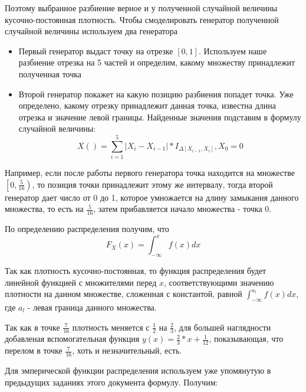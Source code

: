 \documentclass{article}
\begin{document}
Поэтому выбранное разбиение верное и у полученной случайной величины кусочно-постоянная плотность. 
Чтобы смоделировать генератор полученной случайной величины используем два генератора
\begin{itemize}
    \item Первый генератор выдаст точку на отрезке $[0, 1]$. Используем наше разбиение отрезка на
        5 частей и определим, какому множеству принадлежит полученная точка
    \item Второй генератор покажет на какую позицию разбиения попадет точка. Уже
        определено, какому отрезку принадлежит данная точка, известна длина отрезка и значение
        левой границы. Найденные значения подставим в формулу случайной величины:
        \[X() = \sum_{i = 1}^5|X_i - X_{i-1}|*I_{\Delta\left[X_{i-1}, X_{i}\right]},
        X_0 = 0\]
\end{itemize}

Например, если после работы первого генератора точка находится на множестве $\left[0,
\frac{5}{16}\right)$, то позиция точки принадлежит этому же интервалу, тогда второй генератор
дает число от 0 до 1, которое умножается на длину замыкания данного множества, то есть на
$\frac{5}{16}$, затем прибавляется начало множества - точка 0. 

По определению распределения получим, что
\[F_X(x) = \int_{-\infty}^xf(x)dx\]

Так как плотность кусочно-постоянная, то функция распределения будет линейной функцией с
множителями перед $x$, соответствующими значению плотности на данном множестве, сложенная с
константой, равной $\int_{-\infty}^{a_l}f(x)dx$, где $a_l$ - левая граница данного множества.

Так как в точке $\frac{7}{16}$ плотность меняется с $\frac{1}{2}$ на $\frac{2}{3}$, для большей
наглядности добавленая вспомогательная функция $y(x) = \frac{2}{3}*x+\frac{1}{12}$,
показывающая, что перелом в точке $\frac{7}{16}$, хоть и незначительный, есть.

Для эмперической функции распределения используем уже упомянутую в предыдущих заданиях этого
документа формулу. Получим:
\end{document}
